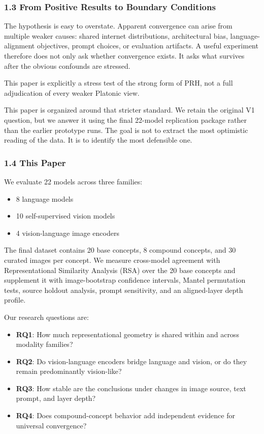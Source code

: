 \documentclass[
]{article}
\providecommand{\tightlist}{%
  \setlength{\itemsep}{0pt}\setlength{\parskip}{0pt}}
\begin{document}
\subsubsection{1.3 From Positive Results to Boundary
Conditions}\label{from-positive-results-to-boundary-conditions}

The hypothesis is easy to overstate. Apparent convergence can arise from
multiple weaker causes: shared internet distributions, architectural
bias, language-alignment objectives, prompt choices, or evaluation
artifacts. A useful experiment therefore does not only ask whether
convergence exists. It asks what survives after the obvious confounds
are stressed.

This paper is explicitly a stress test of the strong form of PRH, not a
full adjudication of every weaker Platonic view.

This paper is organized around that stricter standard. We retain the
original V1 question, but we answer it using the final 22-model
replication package rather than the earlier prototype runs. The goal is
not to extract the most optimistic reading of the data. It is to
identify the most defensible one.

\subsubsection{1.4 This Paper}\label{this-paper}

We evaluate 22 models across three families:

\begin{itemize}
\tightlist
\item
  8 language models
\item
  10 self-supervised vision models
\item
  4 vision-language image encoders
\end{itemize}

The final dataset contains 20 base concepts, 8 compound concepts, and 30
curated images per concept. We measure cross-model agreement with
Representational Similarity Analysis (RSA) over the 20 base concepts and
supplement it with image-bootstrap confidence intervals, Mantel
permutation tests, source holdout analysis, prompt sensitivity, and an
aligned-layer depth profile.

Our research questions are:

\begin{itemize}
\tightlist
\item
  \textbf{RQ1}: How much representational geometry is shared within and
  across modality families?
\item
  \textbf{RQ2}: Do vision-language encoders bridge language and vision,
  or do they remain predominantly vision-like?
\item
  \textbf{RQ3}: How stable are the conclusions under changes in image
  source, text prompt, and layer depth?
\item
  \textbf{RQ4}: Does compound-concept behavior add independent evidence
  for universal convergence?
\end{itemize}
\end{document}

